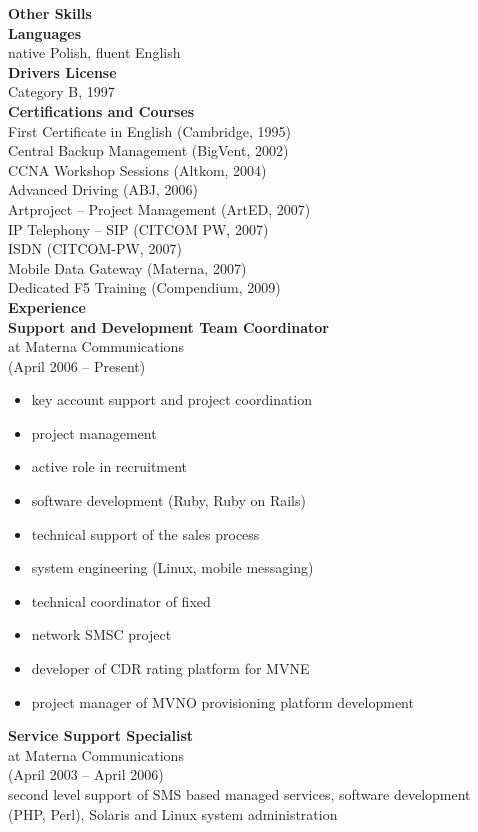 \documentclass[9pt,a4paper,twocolumn]{extarticle}
\begin{document}
{\bf\Large Other Skills}\\
{\bf Languages}\\
native Polish, fluent English\\
{\bf Drivers License}\\
Category B, 1997\\

{\bf\Large Certifications and Courses}\\

First Certificate in English (Cambridge, 1995)\\
Central Backup Management (BigVent, 2002)\\
CCNA Workshop Sessions (Altkom, 2004)\\
Advanced Driving (ABJ, 2006)\\
Artproject – Project Management (ArtED, 2007)\\
IP Telephony – SIP (CITCOM PW, 2007)\\
ISDN (CITCOM-PW, 2007)\\
Mobile Data Gateway (Materna, 2007)\\
Dedicated F5 Training (Compendium, 2009)\\

{\bf\Large Experience}\\

{\bf Support and Development Team Coordinator}\\
at Materna Communications\\
(April 2006 – Present)
\begin{itemize}
\setlength{\itemsep}{0cm}%
\setlength{\parskip}{0cm}%
\item key account support and project coordination
\item project management
\item active role in recruitment
\item software development (Ruby, Ruby on Rails)
\item technical support of the sales process
\item system engineering (Linux, mobile messaging)
\item technical coordinator of ﬁxed 
\item network SMSC project
\item developer of CDR rating platform for MVNE
\item project manager of MVNO provisioning platform development 
\end{itemize}

{\bf Service Support Specialist}\\
at Materna Communications \\
(April 2003 – April 2006) \\
second level support of SMS based managed services, software development (PHP, Perl), Solaris and Linux system administration \\
\end{document}
